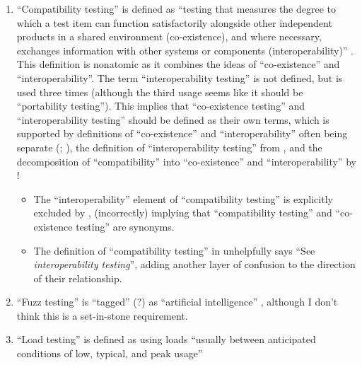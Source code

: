 \begin{enumerate}
      \item ``Compatibility testing'' is defined as ``testing that measures the
            degree to which a test item can function satisfactorily alongside
            other independent products in a shared environment (co-existence),
            and where necessary, exchanges information with other systems or
            components (interoperability)'' \citep[p.~3]{IEEE2022}. This
            definition is nonatomic as it combines the ideas of ``co-existence''
            and ``interoperability''. The term ``interoperability testing'' is
            not defined, but is used three times \citep[pp.~22,~43]{IEEE2022}
            (although the third usage seems like it should be ``portability
            testing''). This implies that ``co-existence testing'' and
            ``interoperability testing'' should be defined as their own terms,
            which is supported by definitions of ``co-existence'' and
            ``interoperability'' often being separate (\citealpISTQB{};
            \citealp[pp.~73,~237]{IEEE2017}), the definition of
            ``interoperability testing'' from \citet[p.~238]{IEEE2017},
            and the decomposition of ``compatibility'' into ``co-existence''
            and ``interoperability'' by \citet{ISO_IEC2023a}!
            \begin{itemize}
                  \item The ``interoperability'' element of ``compatibility
                        testing'' is explicitly excluded by
                        \citet[p.~37]{IEEE2021}, (incorrectly) implying that
                        ``compatibility testing'' and ``co-existence testing''
                        are synonyms.
                  \item The definition of ``compatibility testing'' in
                        \citep[p.~43]{Kam2008} unhelpfully says ``See
                        \emph{interoperability testing}'', adding another
                        layer of confusion to the direction of their
                        relationship.
            \end{itemize}
      \item ``Fuzz testing'' is ``tagged'' (?) as ``artificial intelligence''
            \citep[p.~5]{IEEE2022}, although I don't think this is a
            set-in-stone requirement.
      \item ``Load testing'' is defined as using loads ``usually between
            anticipated conditions of low, typical, and peak usage''

\end{enumerate}
